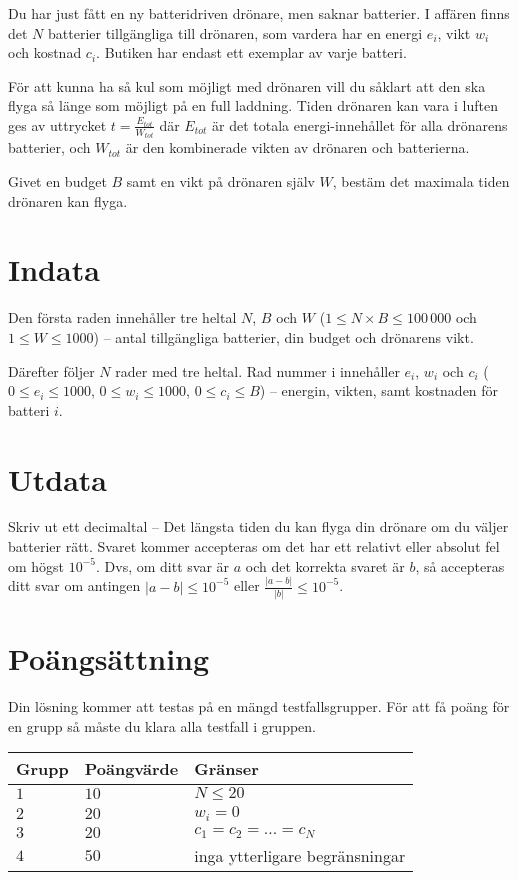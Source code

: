 
Du har just fått en ny batteridriven drönare, men saknar batterier.
I affären finns det $N$ batterier tillgängliga till drönaren,
som vardera har en energi $e_i$, vikt $w_i$ och kostnad $c_i$.
Butiken har endast ett exemplar av varje batteri.

För att kunna ha så kul som möjligt med drönaren vill du såklart att den ska
flyga så länge som möjligt på en full laddning.
Tiden drönaren kan vara i luften ges av uttrycket $t = \frac{E_{tot}}{W_{tot}}$ där $E_{tot}$
är det totala energi-innehållet för alla drönarens batterier, och $W_{tot}$ är den kombinerade vikten av drönaren och batterierna. 

Givet en budget $B$ samt en vikt på drönaren själv $W$, bestäm
det maximala tiden drönaren kan flyga.


\section*{Indata}
Den första raden innehåller tre heltal $N$, $B$ och $W$
($1 \le N\times B \le 100\,000$ och $1\le W \le 1000$) -- antal tillgängliga batterier, din budget och drönarens vikt.

Därefter följer $N$ rader med tre heltal. Rad nummer i innehåller $e_i$,
$w_i$ och $c_i$ ($0 \le e_i \le 1000$, $0 \le w_i \le 1000$, $0 \le c_i \le B$) 
-- energin, vikten, samt kostnaden för batteri $i$.

\section*{Utdata}
Skriv ut ett decimaltal -- Det längsta tiden du kan flyga din drönare om du väljer batterier rätt. 
Svaret kommer accepteras om det har ett relativt eller absolut fel om högst $10^{-5}$.
Dvs, om ditt svar är $a$ och det korrekta svaret är $b$, så accepteras ditt svar om
antingen $|a-b| \le 10^{-5}$ eller $\frac{|a-b|}{|b|} \le 10^{-5}$.

\section*{Poängsättning}
Din lösning kommer att testas på en mängd testfallsgrupper.
För att få poäng för en grupp så måste du klara alla testfall i gruppen.

\noindent
\begin{tabular}{| l | l | l |}
  \hline
  Grupp & Poängvärde & Gränser \\ \hline
  $1$   & $10$       & $N \leq 20$ \\ \hline
  $2$   & $20$       & $w_i = 0$ \\ \hline
  $3$   & $20$       & $c_1 = c_2 = ... = c_N$ \\ \hline
  $4$   & $50$       & inga ytterligare begränsningar \\ \hline
\end{tabular}
